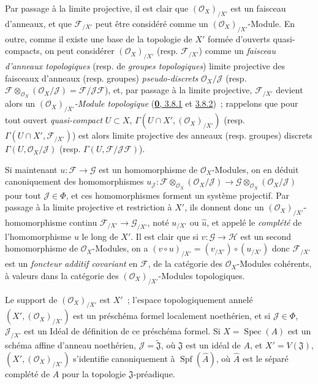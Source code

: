 Par passage à la limite projective, il est clair que
$(\mathscr{O}_X)_{/X'}$ est un faisceau d'anneaux, et que
$\mathscr{F}_{/X'}$ peut être considéré comme un
$(\mathscr{O}_X)_{/X'}$-Module. En outre, comme il existe une base de la
topologie de $X'$ formée d'ouverts quasi-compacts, on peut considérer
$(\mathscr{O}_X)_{/X'}$ (resp. $\mathscr{F}_{/X'}$) comme un
\emph{faisceau d'anneaux topologiques} (resp. de
\emph{groupes topologiques}) limite projective des faisceaux d'anneaux
(resp. groupes) \emph{pseudo-discrets}
$\mathscr{O}_X/\mathscr{J}$ (resp.
$\mathscr{F}\otimes_{\mathscr{O}_X}
(\mathscr{O}_X/\mathscr{J})=\mathscr{F}/\mathscr{J}\mathscr{F}$), et, par
passage à la limite projective, $\mathscr{F}_{/X'}$ devient alors un
\emph{$(\mathscr{O}_X)_{/X'}$-Module topologique}
(\hyperref[0.3.8.1-fr]{\textbf{0}, 3.8.1} et
\hyperref[0.3.8.2-fr]{3.8.2})~; rappelons que pour tout ouvert
\emph{quasi-compact} $U\subset X$,
$\Gamma(U\cap X',(\mathscr{O}_X)_{/X'})$ (resp.
$\Gamma(U\cap X',\mathscr{F}_{/X'})$) est alors limite projective des
anneaux (resp. groupes) discrets $\Gamma(U,\mathscr{O}_X/\mathscr{J})$
(resp. $\Gamma(U,\mathscr{F}/\mathscr{J}\mathscr{F})$).

Si maintenant $u:\mathscr{F}\to\mathscr{G}$ est un homomorphisme de
$\mathscr{O}_X$-Modules, on en déduit canoniquement des homomorphismes
$u_{\mathscr{J}}:
\mathscr{F}\otimes_{\mathscr{O}_X}(\mathscr{O}_X/\mathscr{J})
\to
\mathscr{G}\otimes_{\mathscr{O}_X}(\mathscr{O}_X/\mathscr{J})$
pour tout $\mathscr{J}\in\Phi$, et ces homomorphismes forment un système
projectif. Par passage à la limite projective et restriction à $X'$, ils
donnent donc un $(\mathscr{O}_X)_{/X'}$-homomorphisme continu
$\mathscr{F}_{/X'}\to\mathscr{G}_{/X'}$, noté $u_{/X'}$ ou $\widehat u$,
et appelé le \emph{complété} de l'homomorphisme $u$ le long de $X'$. Il est
clair que si $v:\mathscr{G}\to\mathscr{H}$ est un second homomorphisme de
$\mathscr{O}_X$-Modules, on a
$(v\circ u)_{/X'}=(v_{/X'})\circ(u_{/X'})$ donc
$\mathscr{F}_{/X'}$ est un \emph{foncteur additif covariant} en
$\mathscr{F}$, de la catégorie des $\mathscr{O}_X$-Modules cohérents, à
valeurs dans la catégorie des $(\mathscr{O}_X)_{/X'}$-Modules topologiques.

\begin{proposition}[10.8.5]
\label{I.10.8.5-fr}
Le support de $(\mathscr{O}_X)_{/X'}$ est $X'$~; l'espace topologiquement
annelé $(X',(\mathscr{O}_X)_{/X'})$ est un préschéma formel localement
noethérien, et si $\mathscr{J}\in\Phi$, $\mathscr{J}_{/X'}$ est un Idéal de
définition de ce préschéma formel. Si $X=\operatorname{Spec}(A)$ est un
schéma affine d'anneau noethérien, $\mathscr{J}=\widetilde{\mathfrak{J}}$,
où $\mathfrak{J}$ est un idéal de $A$, et $X'=V(\mathfrak{J})$,
$(X',(\mathscr{O}_X)_{/X'})$ s'identifie canoniquement à
$\operatorname{Spf}(\widehat A)$, où $\widehat A$ est le séparé complété de
$A$ pour la topologie $\mathfrak{J}$-préadique.
\end{proposition}

